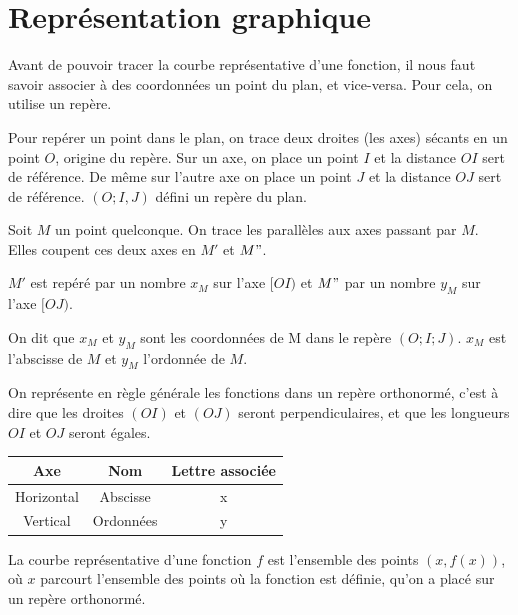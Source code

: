 \documentclass[10pt,a4paper]{book}
\begin{document}
\section{Représentation graphique}

Avant de pouvoir tracer la courbe représentative d'une fonction, il nous faut savoir associer à des coordonnées un point du plan, et vice-versa. Pour cela, on utilise un repère.

\begin{de}[Repère]
Pour repérer un point dans le plan, on trace deux droites (les axes) sécants en un point $O$, origine du repère. Sur un axe, on place un point $I$ et la distance $OI$ sert de référence. De même sur l'autre axe on place un point $J$ et la distance $OJ$ sert de référence. $(O;I,J)$ défini un repère du plan. 

 Soit $M$ un point quelconque. On trace les parallèles aux axes passant par $M$. Elles coupent ces deux axes en $M'$ et $M"$.

$M'$ est repéré par un nombre $x_{M}$ sur l'axe $[OI)$ et $M"$ par un nombre $y_{M}$ sur l'axe $[OJ)$.

On dit que $x_{M}$ et $y_{M}$ sont les coordonnées de M dans le repère $(O;I;J)$. $x_{M}$ est l’abscisse de $M$ et $y_{M}$ l’ordonnée de $M$.
\end{de}


On représente en règle générale les fonctions dans un repère orthonormé, c'est à dire que les droites $(OI)$ et $(OJ)$ seront perpendiculaires, et que les longueurs $OI$ et $OJ$ seront égales.

\begin{center}
    \begin{tabular}{|c|c|c|}
        \hline
         Axe & Nom & Lettre associée  \\
        \hline
        Horizontal & Abscisse & x \\
        \hline
        Vertical & Ordonnées & y \\
        \hline
    \end{tabular}
\end{center}

\begin{de}
    La courbe représentative d'une fonction $f$ est l'ensemble des points $(x,f(x))$, où $x$ parcourt l'ensemble des points où la fonction est définie, qu'on a placé sur un repère orthonormé.
\end{de}
\end{document}

